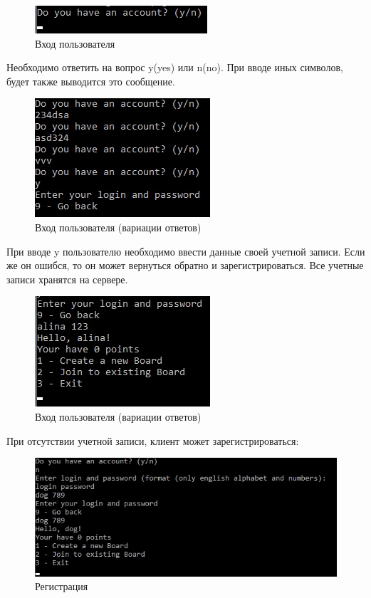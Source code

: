 \documentclass[a4paper,14pt]{extarticle} %
\begin{document}
\begin{figure}[h]
	\centering
	\includegraphics[width=0.5\linewidth]{ENTER.jpg}
	\caption{Вход пользователя}
	\label{fig:mpr}
\end{figure}
Необходимо ответить на вопрос y(yes) или n(no). При вводе иных символов, будет также выводится это сообщение.
\begin{figure}[h]
	\centering
	\includegraphics[width=0.5\linewidth]{ENTER4.jpg}
	\caption{Вход пользователя (вариации ответов)}
	\label{fig:mpr}
\end{figure}
\newpage
При вводе y пользователю необходимо ввести данные своей учетной записи. Если же он ошибся, то он может вернуться обратно и зарегистрироваться. Все учетные записи хранятся на сервере.
\begin{figure}[h]
	\centering
	\includegraphics[width=0.5\linewidth]{ENTER5.jpg}
	\caption{Вход пользователя (вариации ответов)}
	\label{fig:mpr}
\end{figure}

При отсутствии учетной записи, клиент может зарегистрироваться: 
\begin{figure}[h]
	\centering
	\includegraphics[width=0.7\linewidth]{REG6.jpg}
	\caption{Регистрация}
	\label{fig:mpr}
\end{figure}
\end{document}
